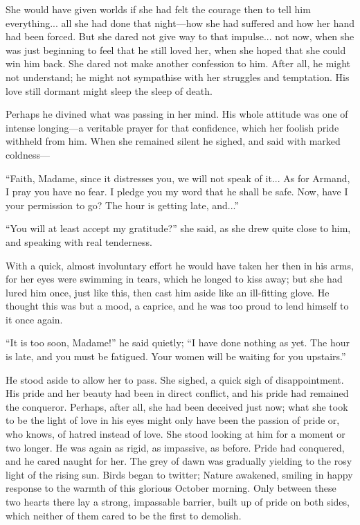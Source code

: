 \documentclass[paper=a5,BCOR=7mm,twoside,DIV=calc,12pt,usegeometry,chapterprefix,endperiod,headings=big]{scrbook}
\begin{document}
She would have given worlds if she had felt the courage then to tell him everything... all she had done that night---how she had suffered and how her hand had been forced. But she dared not give way to that impulse... not now, when she was just beginning to feel that he still loved her, when she hoped that she could win him back. She dared not make another confession to him. After all, he might not understand; he might not sympathise with her struggles and temptation. His love still dormant might sleep the sleep of death.

Perhaps he divined what was passing in her mind. His whole attitude was one of intense longing---a veritable prayer for that confidence, which her foolish pride withheld from him. When she remained silent he sighed, and said with marked coldness---

\enquote{Faith, Madame, since it distresses you, we will not speak of it... As for Armand, I pray you have no fear. I pledge you my word that he shall be safe. Now, have I your permission to go? The hour is getting late, and...}

\enquote{You will at least accept my gratitude?} she said, as she drew quite close to him, and speaking with real tenderness.

With a quick, almost involuntary effort he would have taken her then in his arms, for her eyes were swimming in tears, which he longed to kiss away; but she had lured him once, just like this, then cast him aside like an ill-fitting glove. He thought this was but a mood, a caprice, and he was too proud to lend himself to it once again.

\enquote{It is too soon, Madame!} he said quietly; \enquote{I have done nothing as yet. The hour is late, and you must be fatigued. Your women will be waiting for you upstairs.}

He stood aside to allow her to pass. She sighed, a quick sigh of disappointment. His pride and her beauty had been in direct conflict, and his pride had remained the conqueror. Perhaps, after all, she had been deceived just now; what she took to be the light of love in his eyes might only have been the passion of pride or, who knows, of hatred instead of love. She stood looking at him for a moment or two longer. He was again as rigid, as impassive, as before. Pride had conquered, and he cared naught for her. The grey of dawn was gradually yielding to the rosy light of the rising sun. Birds began to twitter; Nature awakened, smiling in happy response to the warmth of this glorious October morning. Only between these two hearts there lay a strong, impassable barrier, built up of pride on both sides, which neither of them cared to be the first to demolish.
\end{document}
